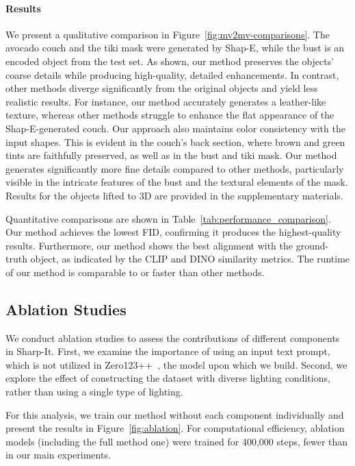 \paragraph{Results}
We present a qualitative comparison in Figure~\ref{fig:mv2mv-comparisons}. The avocado couch and the tiki mask were generated by Shap-E, while the bust is an encoded object from the test set. As shown, our method preserves the objects' coarse details while producing high-quality, detailed enhancements. In contrast, other methods diverge significantly from the original objects and yield less realistic results. For instance, our method accurately generates a leather-like texture, whereas other methods struggle to enhance the flat appearance of the Shap-E-generated couch.
Our approach also maintains color consistency with the input shapes. This is evident in the couch's back section, where brown and green tints are faithfully preserved, as well as in the bust and tiki mask. Our method generates significantly more fine details compared to other methods, particularly visible in the intricate features of the bust and the textural elements of the mask. 
Results for the objects lifted to 3D are provided in the supplementary materials.

Quantitative comparisons are shown in Table~\ref{tab:performance_comparison}. Our method achieves the lowest FID, confirming it produces the highest-quality results. Furthermore, our method shows the best alignment with the ground-truth object, as indicated by the CLIP and DINO similarity metrics. The runtime of our method is comparable to or faster than other methods.

\subsection{Ablation Studies}



We conduct ablation studies to assess the contributions of different components in Sharp-It. 
First, we examine the importance of using an input text prompt, which is not utilized in Zero123++~\cite{shi2023zero123singleimageconsistent, xu2024instantmesh}, the model upon which we build.
Second, we explore the effect of constructing the dataset with diverse lighting conditions, rather than using a single type of lighting.

For this analysis, we train our method without each component individually and present the results in Figure~\ref{fig:ablation}.
For computational efficiency, ablation models (including the full method one) were trained for 400,000 steps, fewer than in our main experiments.

